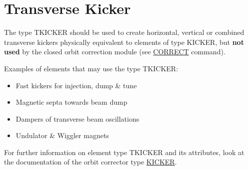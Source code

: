 
\section{Transverse Kicker}

The type TKICKER should be used to create horizontal, vertical or
combined transverse kickers physically equivalent to elements of type
KICKER, but \textbf{not used} by the closed orbit correction module (see
\href{../cororbit/co_correct.html}{CORRECT} command).   

Examples of elements that may use the type TKICKER: 
\begin{itemize}
   \item Fast kickers for injection, dump \& tune
   \item Magnetic septa towards beam dump
   \item Dampers of transverse beam oscillations
   \item Undulator \& Wiggler magnets
\end{itemize}

For further information on element type TKICKER and its attributes, look
at the documentation of the orbit corrector type
\href{kickers.html#kick}{KICKER}.   

